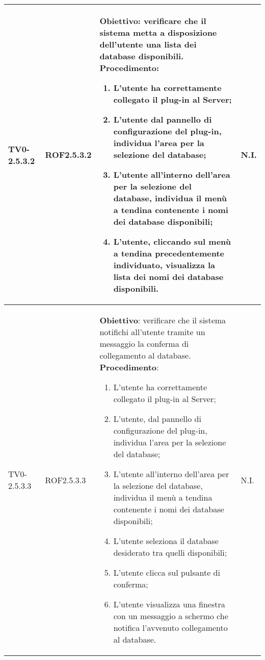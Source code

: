 \begin{longtable}{|C{.15\textwidth}|C{.13\textwidth}|m{.65\textwidth}|C{.08\textwidth}|}
TV0-2.5.3.2 & ROF2.5.3.2 &
	\textbf{Obiettivo}: verificare che il sistema metta a disposizione dell'utente una lista dei database disponibili. \newline
	\textbf{Procedimento}:
	\begin{enumerate}
		\item L'utente ha correttamente collegato il plug-in al Server;
		\item L'utente dal pannello di configurazione del plug-in, individua l'area per la selezione del database;
		\item L'utente all'interno dell'area per la selezione del database, individua il menù a tendina contenente i nomi dei database disponibili;
		\item L'utente, cliccando sul menù a tendina precedentemente individuato, visualizza la lista dei nomi dei database disponibili.
		\end{enumerate} & N.I. \\
\hline

TV0-2.5.3.3 & ROF2.5.3.3 &
	\textbf{Obiettivo}: verificare che il sistema notifichi all'utente tramite un messaggio la conferma di collegamento al database. \newline
	\textbf{Procedimento}:
	\begin{enumerate}
		\item L'utente ha correttamente collegato il plug-in al Server;
		\item L'utente, dal pannello di configurazione del plug-in, individua l'area per la selezione del database;
		\item L'utente all'interno dell'area per la selezione del database, individua il menù a tendina contenente i nomi dei database disponibili;
		\item L'utente seleziona il database desiderato tra quelli disponibili;
		\item L'utente clicca sul pulsante di conferma;
		\item L'utente visualizza una finestra con un messaggio a schermo che notifica l'avvenuto collegamento al database.		
			\end{enumerate} & N.I. \\
\hline


\end{longtable}

